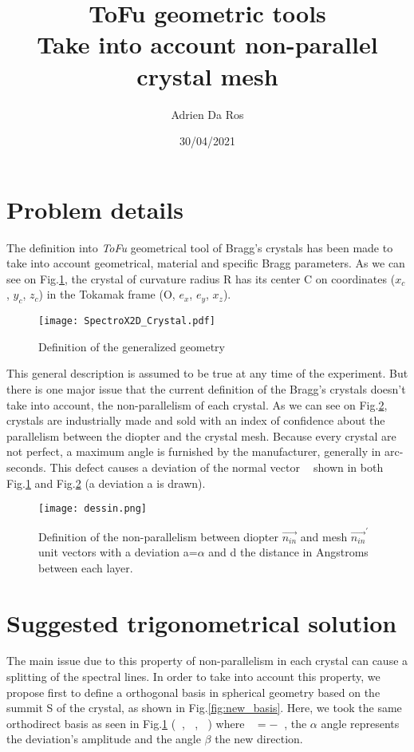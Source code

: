\documentclass[a4paper,11pt,twoside,openright]{article}
\DeclareMathOperator{\ei}{\underline{e}_1}
\DeclareMathOperator{\et}{\underline{e}_2}
\DeclareMathOperator{\nin}{\underline{n}_{in}}
\DeclareMathOperator{\nout}{\underline{n}_{out}}
\begin{document}
\title{ToFu geometric tools \\ Take into account non-parallel crystal mesh}
\author{Adrien Da Ros}
\date{30/04/2021}
\maketitle

\tableofcontents
\newpage
\section{Problem details}
The definition into \textit{ToFu} geometrical tool of Bragg's crystals has been made to take into account geometrical, material and specific Bragg parameters. As we can see on Fig.\ref{fig:general_geom}, the crystal of curvature radius R has its center C on coordinates ($x_{c}$, $y_{c}$, $z_{c}$) in the Tokamak frame (O, $e_{x}$, $e_{y}$, $x_{z}$). \par

\begin{figure}[h]
    \centering
    \texttt{[image: SpectroX2D\_Crystal.pdf]}
    \caption{Definition of the generalized geometry}
    \label{fig:general_geom}
\end{figure}

This general description is assumed to be true at any time of the experiment. But there is one major issue that the current definition of the Bragg's crystals doesn't take into account, the non-parallelism of each crystal. As we can see on Fig.\ref{fig:non_para}, crystals are industrially made and sold with an index of confidence about the parallelism between the diopter and the crystal mesh. Because every crystal are not perfect, a maximum angle is furnished by the manufacturer, generally in arc-seconds. This defect causes a deviation of the normal vector $\nout$ shown in both Fig.\ref{fig:general_geom} and Fig.\ref{fig:non_para} (a deviation a is drawn).

\begin{figure}[h]
    \centering
    \texttt{[image: dessin.png]}
    \caption{Definition of the non-parallelism between diopter $\overrightarrow{n_{in}}$ and mesh $\overrightarrow{n_{in}}^{'}$ unit vectors with a deviation a=$\alpha$ and d the distance in Angstroms between each layer.}
    \label{fig:non_para}
\end{figure}
\newpage
\section{Suggested trigonometrical solution}
The main issue due to this property of non-parallelism in each crystal can cause a splitting of the spectral lines.
In order to take into account this property, we propose first to define a orthogonal basis in spherical geometry based on the summit S of the crystal, as shown in Fig.\ref{fig:new_basis}.
Here, we took the same orthodirect basis as seen in Fig.\ref{fig:general_geom} ($\nout$, $\ei$, $\et$) where $\nout = -\nin$, the $\alpha$ angle represents the deviation's amplitude and the angle $\beta$ the new direction.
\end{document}
